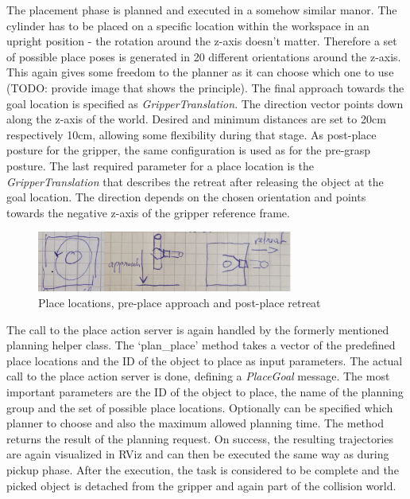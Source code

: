 The placement phase is planned and executed in a somehow similar manor. The cylinder has to be placed on a specific location within the workspace in an upright position - the rotation around the z-axis doesn't matter. Therefore a set of possible place poses is generated in 20 different orientations around the z-axis. This again gives some freedom to the planner as it can choose which one to use (TODO: provide image that shows the principle). The final approach towards the goal location is specified as \emph{GripperTranslation}. The direction vector points down along the z-axis of the world. Desired and minimum distances are set to 20cm respectively 10cm, allowing some flexibility during that stage. As post-place posture for the gripper, the same configuration is used as for the pre-grasp posture. The last required parameter for a place location is the \emph{GripperTranslation} that describes the retreat after releasing the object at the goal location. The direction depends on the chosen orientation and points towards the negative z-axis of the gripper reference frame. 

\begin{figure}[ht]
	\centering
  	\includegraphics[width=0.75\textwidth]{images/place_stages.jpg}
	\caption{Place locations, pre-place approach and post-place retreat}
	\label{fig:place_stages}
\end{figure}

The call to the place action server is again handled by the formerly mentioned planning helper class. The `plan\_place' method takes a vector of the predefined place locations and the ID of the object to place as input parameters. The actual call to the place action server is done, defining a \emph{PlaceGoal} message. The most important parameters are the ID of the object to place, the name of the planning group and the set of possible place locations. Optionally can be specified which planner to choose and also the maximum allowed planning time. The method returns the result of the planning request. On success, the resulting trajectories are again visualized in RViz and can then be executed the same way as during pickup phase. After the execution, the task is considered to be complete and the picked object is detached from the gripper and again part of the collision world.


